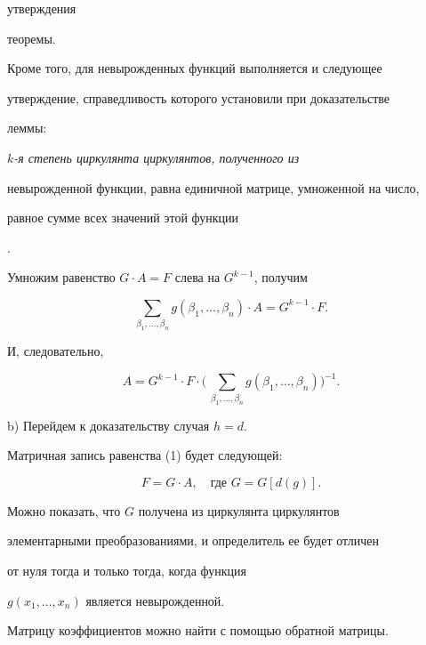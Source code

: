 утверждения


теоремы.





Кроме того, для невырожденных функций выполняется и следующее


утверждение, справедливость которого установили при доказательстве


леммы: {\it $k$-я степень циркулянта циркулянтов, полученного из


невырожденной функции, равна единичной матрице, умноженной на число,


равное сумме всех значений этой функции}.





Умножим равенство $G\cdot A=F$ слева на $G^{k-1}$, получим


$$


\sum_{\beta_1,\dotsc,\beta_n}g(\beta_1,\dotsc,\beta_n)


\cdot A=G^{k-1}\cdot F.


$$


И, следовательно,


$$


A=G^{k-1}\cdot F\cdot\biggl(\,\sum_{\beta_1,\dotsc,\beta_n}


g(\beta_1,\dotsc,\beta_n)\biggr)^{-1}.


$$





b) Перейдем к доказательству случая $h=d$.





Матричная запись равенства (1) будет следующей:


$$


F=G\cdot A,\quad


\text{где }G=G[d(g)].


$$





Можно показать, что $G$ получена из циркулянта циркулянтов


элементарными преобразованиями, и определитель ее будет отличен


от нуля тогда и только тогда, когда функция


$g(x_1,\dotsc,x_n)$ является невырожденной.





Матрицу коэффициентов можно найти с помощью обратной матрицы.





